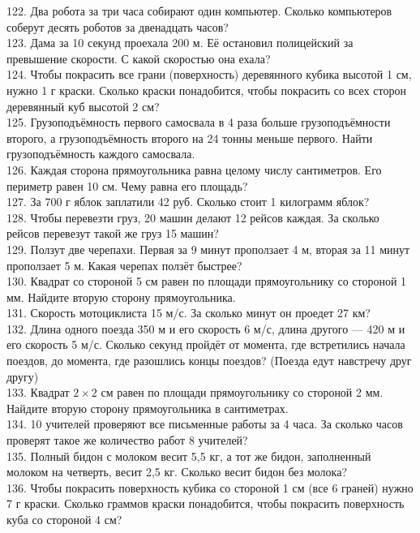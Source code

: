 122. Два робота за три часа собирают один компьютер. Сколько компьютеров соберут десять роботов за двенадцать часов?\\
123. Дама за 10 секунд проехала 200 м. Её остановил полицейский за превышение скорости. С какой скоростью она ехала?\\
124. Чтобы покрасить все грани (поверхность) деревянного кубика высотой 1 см, нужно 1 г краски. Сколько краски понадобится, чтобы покрасить со всех сторон деревянный куб высотой 2 см?\\
125. Грузоподъёмность первого самосвала в 4 раза больше грузоподъёмности второго, а грузоподъёмность второго на 24 тонны меньше первого. Найти грузоподъёмность каждого самосвала.\\
126. Каждая сторона прямоугольника равна целому числу сантиметров. Его периметр равен 10 см. Чему равна его площадь?\\
127. За 700 г яблок заплатили 42 руб. Сколько стоит 1 килограмм яблок?\\
128. Чтобы перевезти груз, 20 машин делают 12 рейсов каждая. За сколько рейсов перевезут такой же груз 15 машин?\\
129. Ползут две черепахи. Первая за 9 минут проползает 4 м, вторая за 11 минут проползает 5 м. Какая черепах ползёт быстрее?\\
130. Квадрат со стороной 5 см равен по площади прямоугольнику со стороной 1 мм. Найдите вторую сторону прямоугольника.\\
131. Скорость мотоциклиста 15 м/с. За сколько минут он проедет 27 км?\\
132. Длина одного поезда 350 м и его скорость 6 м/с, длина другого --- 420 м и его скорость 5 м/с. Сколько секунд пройдёт от момента, где встретились начала поездов, до момента, где разошлись концы поездов? (Поезда едут навстречу друг другу)\\
133. Квадрат $2\times2$ см равен по площади прямоугольнику со стороной 2 мм. Найдите вторую сторону прямоугольника в сантиметрах.\\
134. 10 учителей проверяют все письменные работы за 4 часа. За сколько часов проверят такое же количество работ 8 учителей?\\
135. Полный бидон с молоком весит 5,5 кг, а тот же бидон, заполненный молоком на четверть, весит 2,5 кг. Сколько весит бидон без молока?\\
136. Чтобы покрасить поверхность кубика со стороной 1 см (все 6 граней) нужно 7 г краски. Сколько граммов краски понадобится, чтобы покрасить поверхность куба со стороной 4 см?\\
